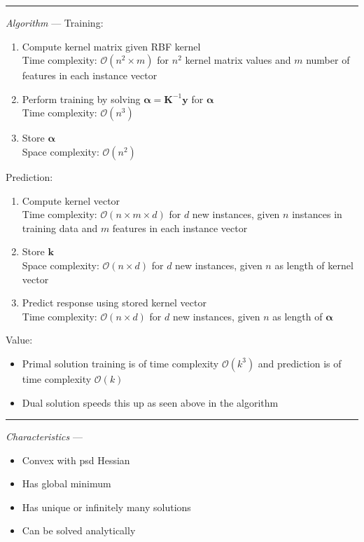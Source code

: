 {\color{lightgray}\hrule height 0.001mm}

\emph{Algorithm} --- 
Training:
\begin{enumerate}
    \item Compute kernel matrix given RBF kernel\\
    Time complexity: $\mathcal{O}(n^2 \times m)$ for $n^2$ kernel matrix values and $m$ number of features in each instance vector
    \item Perform training by solving $\boldsymbol{\alpha} = \boldsymbol{K}^{-1} \boldsymbol{y}$ for $\boldsymbol{\alpha}$\\
    Time complexity: $\mathcal{O}(n^3)$ 
    \item Store $\boldsymbol{\alpha}$\\
    Space complexity: $\mathcal{O}(n^2)$ 
\end{enumerate}
Prediction:
\begin{enumerate}
    \item Compute kernel vector\\
    Time complexity: $\mathcal{O}(n \times m \times d)$ for $d$ new instances, given $n$ instances in training data and $m$ features in each instance vector
    \item Store $\boldsymbol{k}$\\
    Space complexity: $\mathcal{O}(n \times d)$ for $d$ new instances, given $n$ as length of kernel vector
    \item Predict response using stored kernel vector\\
    Time complexity: $\mathcal{O}(n \times d)$ for $d$ new instances, given $n$ as length of $\boldsymbol{\alpha}$
\end{enumerate}
Value:
\begin{itemize}
    \item Primal solution training is of time complexity $\mathcal{O}(k^3)$ and prediction is of time complexity $\mathcal{O}(k)$
    \item Dual solution speeds this up as seen above in the algorithm
\end{itemize}

{\color{lightgray}\hrule height 0.001mm}

\emph{Characteristics} --- 
\begin{itemize}
    \item Convex with psd Hessian
    \item Has global minimum
    \item Has unique or infinitely many solutions
    \item Can be solved analytically 
\end{itemize}

